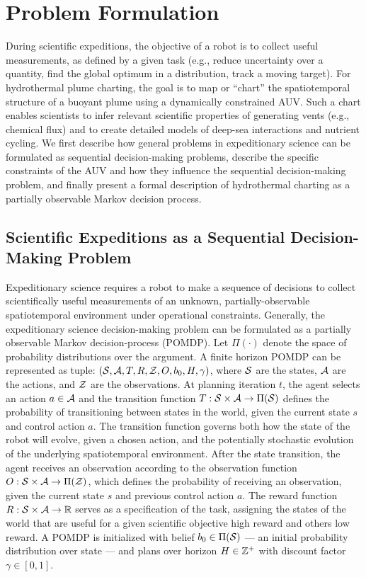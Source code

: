 \section{Problem Formulation}
\label{sec:problem}
During scientific expeditions, the objective of a robot is to collect useful measurements, as defined by a given task (e.g., reduce uncertainty over a quantity, find the global optimum in a distribution, track a moving target). For hydrothermal plume charting, the goal is to map or ``chart'' the spatiotemporal structure of a buoyant plume using a dynamically constrained AUV. Such a chart enables scientists to infer relevant scientific properties of generating vents (e.g., chemical flux) and to create detailed models of deep-sea interactions and nutrient cycling. We first describe how general problems in expeditionary science can be formulated as sequential decision-making problems, describe the specific constraints of the AUV \Sentry and how they influence the sequential decision-making problem, and finally present a formal description of hydrothermal charting as a partially observable Markov decision process. 

\subsection{Scientific Expeditions as a Sequential Decision-Making Problem}
Expeditionary science requires a robot to make a sequence of decisions to collect scientifically useful measurements of an unknown, partially-observable spatiotemporal environment under operational constraints. Generally, the expeditionary science decision-making problem can be formulated as a partially observable Markov decision-process (POMDP). Let $\Pi(\cdot)$ denote the space of probability distributions over the argument. A finite horizon POMDP can be represented as tuple: $(\mathcal{S}, \mathcal{A}, T, R, \mathcal{Z}, O, b_0, H, \gamma)$, where $\mathcal{S}$ are the states, $\mathcal{A}$ are the actions, and $\mathcal{Z}$ are the observations. At planning iteration $t$, the agent selects an action $a \in \mathcal{A}$ and the transition function $T: \mathcal{S} \times \mathcal{A} \to \Pi(\mathcal{S})$ defines the probability of transitioning between states in the world, given the current state $s$ and control action $a$. The transition function governs both how the state of the robot will evolve, given a chosen action, and the potentially stochastic evolution of the underlying spatiotemporal environment. After the state transition, the agent receives an observation according to the observation function $O: \mathcal{S} \times \mathcal{A} \to \Pi(\mathcal{Z})$, which defines the probability of receiving an observation, given the current state $s$ and previous control action $a$. The reward function $R: \mathcal{S} \times \mathcal{A} \to \mathbb{R}$ serves as a specification of the task, assigning the states of the world that are useful for a given scientific objective high reward and others low reward. A POMDP is initialized with belief $b_0 \in \Pi(\mathcal{S})$ --- an initial probability distribution over state --- and plans over horizon $H \in \mathbb{Z}^+$ with discount factor $\gamma \in [0, 1]$.

